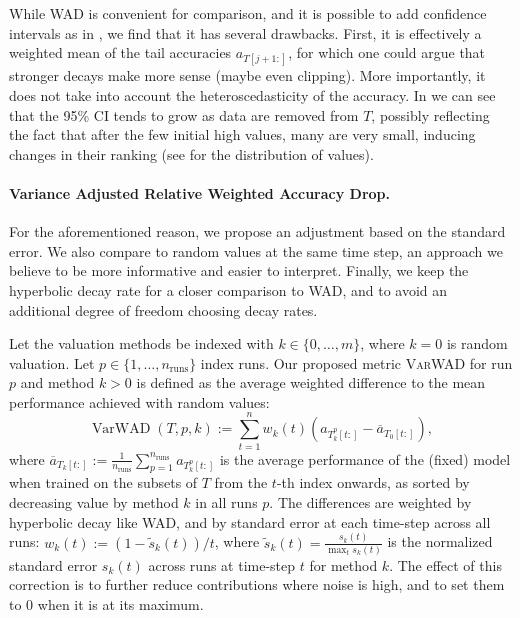 \documentclass[10pt]{article}
\newcommand{\assign}{:=}
\newcommand{\tmname}[1]{\textsc{#1}}
\newcommand{\tmop}[1]{\ensuremath{\operatorname{#1}}}
\begin{document}
While WAD is convenient for comparison, and it is possible to add confidence
intervals as in , we find that it has several drawbacks.
First, it is effectively a weighted mean of the tail accuracies $a_{T [j + 1
:]}$, for which one could argue that stronger decays make more sense (maybe
even clipping). More importantly, it does not take into account the
heteroscedasticity of the accuracy. In  we can see that
the 95\% CI tends to grow as data are removed from $T$, possibly reflecting
the fact that after the few initial high values, many are very small, inducing
changes in their ranking (see  for the distribution of
values).

\paragraph{Variance Adjusted Relative Weighted Accuracy Drop.}For the
aforementioned reason, we propose an adjustment based on the standard error.
We also compare to random values at the same time step, an approach we believe
to be more informative and easier to interpret. Finally, we keep the
hyperbolic decay rate for a closer comparison to WAD, and to avoid an
additional degree of freedom choosing decay rates.

Let the valuation methods be indexed with $k \in \{ 0, \ldots, m \}$, where $k
= 0$ is random valuation. Let $p \in \{ 1, \ldots, n_{\tmop{runs}} \}$ index
runs. Our proposed metric {\tmname{VarWAD}} for run $p$ and method $k > 0$ is
defined as the average weighted difference to the mean performance achieved
with random values:
\begin{equation}
  \tmop{VarWAD} (T, p, k) \assign \sum_{t = 1}^n w_k (t)  (a_{T^p_k [t :]} -
  \overline{a}_{T_0 [t :]}), \label{eq:varwad}
\end{equation}
where $\overline{a}_{T_k [t :]} \assign \frac{1}{n_{\tmop{runs}}}  \sum_{p =
1}^{n_{\tmop{runs}}} a_{T_k^p [t :]}$ is the average performance of the
(fixed) model when trained on the subsets of $T$ from the $t$-th index
onwards, as sorted by decreasing value by method $k$ in all runs $p$. The
differences are weighted by hyperbolic decay like WAD, and by standard error
at each time-step across all runs: $w_k (t) \assign (1 - \tilde{s}_k (t)) /
t$, where $\tilde{s}_k (t) = \frac{s_k (t)}{\max_t s_k (t)}$ is the normalized
standard error $s_k (t)$ across runs at time-step $t$ for method $k$. The
effect of this correction is to further reduce contributions where noise is
high, and to set them to 0 when it is at its maximum.
\end{document}
